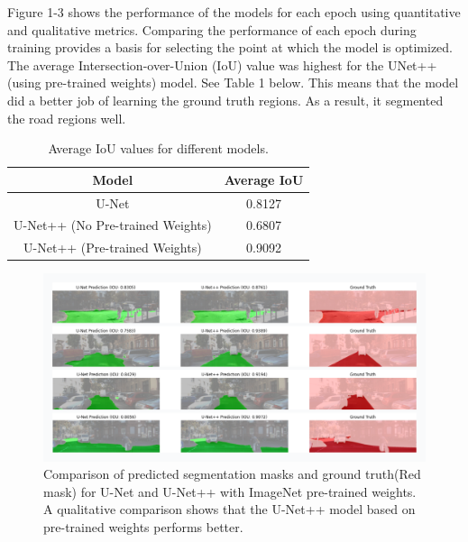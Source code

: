 \documentclass[10pt,twocolumn,letterpaper,final]{article} %
\begin{document}
Figure 1-3 shows the performance of the models for each epoch using quantitative and qualitative metrics. Comparing the performance of each epoch during training provides a basis for selecting the point at which the model is optimized. The average Intersection-over-Union (IoU) value was highest for the UNet++ (using pre-trained weights) model.
 See Table 1 below. This means that the model did a better job of learning the ground truth regions. As a result, it segmented the road regions well.

\vspace{10pt} %

\begin{table}[h]
\centering
\caption{Average IoU values for different models.}
\label{tab:iou_comparison}
\begin{tabular}{|c|c|}
\hline
\textbf{Model} & \textbf{Average IoU} \\ \hline
U-Net & 0.8127 \\ \hline
U-Net++ (No Pre-trained Weights) & 0.6807 \\ \hline
U-Net++ (Pre-trained Weights) & 0.9092 \\ \hline
\end{tabular}
\end{table}

\vspace{10pt} %

\begin{figure}[H]
    \centering
    \includegraphics[width=\linewidth]{ground.png}
    \caption{Comparison of predicted segmentation masks and ground truth(Red mask) for U-Net and U-Net++ with ImageNet pre-trained weights. A qualitative comparison shows that the U-Net++ model based on pre-trained weights performs better.  }
    \label{fig:unet++_with_weights}
\end{figure}
\end{document}

